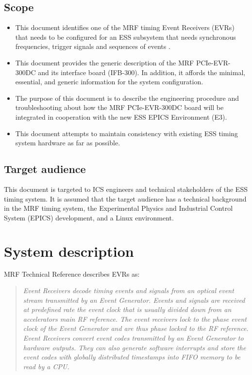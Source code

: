 \documentclass[11pt
  , a4paper
  , article
  , oneside
  , showtrims
]{memoir}
\begin{document}
\section{Scope}
\begin{itemize}
\item This document identifies one of the MRF timing Event Receivers (EVRs) that needs to be configured for an ESS subsystem that needs synchronous frequencies, trigger signals and sequences of events \cite{MRFEVENTSYSTEMDC}.
\item This document provides the generic description of the MRF PCIe-EVR-300DC and its interface board (IFB-300). In addition, it affords the minimal, essential, and generic information for the system configuration.
\item The purpose of this document is to describe the engineering procedure and troubleshooting about how the MRF PCIe-EVR-300DC board will be integrated in cooperation with the new ESS EPICS Environment (E3).
\item This document attempts to maintain consistency with existing ESS timing system hardware as far as possible.
\end{itemize}


\section{Target audience}
This document is targeted to ICS engineers and technical stakeholders of the ESS timing system. It is assumed that the target audience has a technical background in the MRF timing system, the Experimental Physics and Industrial Control System (EPICS) development, and a Linux environment.\\


\chapter{System description}
MRF Technical Reference \citep[see][p45]{MRFEVENTSYSTEMDC} describes EVRs as:
\blockquote{\textit{Event Receivers decode timing events and signals from an optical event stream transmitted by an Event Generator. Events and signals are received at predefined rate the event clock that is usually divided down from an accelerators main RF reference. The event receivers lock to the phase event clock of the Event Generator and are thus phase locked to the RF reference. Event Receivers convert event codes transmitted by an Event Generator to hardware outputs. They can also generate software interrupts and store the event codes with globally distributed timestamps into FIFO memory to be read by a CPU.}}
\end{document}
